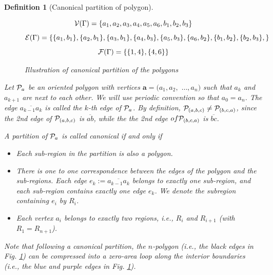 \documentclass[10pt,reqno]{article}
\theoremstyle{plain} %
\newtheorem{definition}[theorem]{Definition}
\theoremstyle{remark}
\numberwithin{equation}{section}
\begin{document}
\begin{definition}[Canonical partition of polygon]
\begin{figure}[ht]
{
    }
    $${\cal V}(\Gamma)=\{ a_1,a_2,a_3,a_4,a_5,a_6,b_1,b_2,b_3 \}$$
    $${\cal E}(\Gamma)=\{\{a_1,b_1\}, \{a_2,b_1\}, 
    \{a_3,b_1\}, \{a_4,b_3\},\{a_5,b_3\},\{a_6,b_2\},\{b_1,b_2\}, \{b_2,b_3\}, \}$$
    $$
    {\cal F}(\Gamma)=\{\{1,4\},\{4,6\}\}$$
      \caption{Illustration of canonical partition of the polygons}
      \label{fig_SPPol}
\end{figure}

Let ${{\cal P} }_{\textbf{a}}$ be an oriented polygon with vertices $\textbf{a}=(a_1,a_2,$ $\ldots ,a_n)$ such that $a_k$ and $a_{k+1}$ are next to each other. 
We will use periodic  convention so that $a_0=a_n$. The edge $\overline{a_{k-1}a_k}$ is called the $k$-th edge of ${{\cal P} }_{\textbf{a}}$. By definition, 
${{\cal P} }_{(a,b,c)}\ne {{\cal P} }_{(b,c,a)}$, 
since the  2nd edge of  ${{\cal P} }_{(a,b,c)}$  is $\overline{ab}$, while the the 2nd edge $of {{\cal P} }_{( b,c,a)}$  is $\overline{bc}$. 

A partition of  ${{\cal P} }_{\textbf{a}}$ is called canonical  %
if and only if 
\begin{itemize}
\item Each  sub-region in the partition is also a polygon. 
     \item There is one to one correspondence between the edges of the polygon and the  sub-regions. Each edge $e_k:=\overline {a_{k-1}a_{k}}$ belongs to  exactly one sub-region, and each  sub-region contains exactly one edge  $e_k$.   We denote the subregion containing $e_i$ by $R_i$.  
   \item Each vertex $a_i$  belongs to exactly two regions, i.e.,  $R_i$ and $R_{i+1}$ (with $R_1=R_{n+1}$). 
  
\end{itemize}
Note that following a canonical partition, the $n$-polygon (i.e., the black edges in Fig. \ref{fig_SPPol}) can be compressed into a zero-area loop along the interior boundaries (i.e., the blue and purple edges in Fig. \ref{fig_SPPol}).




\end{definition}
\end{document}
